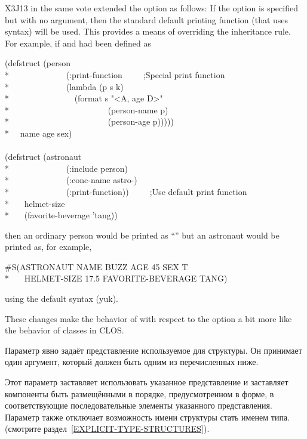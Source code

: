 \begin{flushdesc}
\begin{new}
  X3J13 in the same vote extended the  option as follows: If
  the  option is specified but with no argument, then the
  standard default printing function (that uses  syntax) will be used.
  This provides a means of overriding the inheritance rule.  For example, if
   and  had been defined as
\begin{lisp}
(defstruct (person \\*
~~~~~~~~~~~~~(:print-function~~~~~;\textrm{Special print function}\\*
~~~~~~~~~~~~~(lambda (p s k) \\*
~~~~~~~~~~~~~~~(format s "<{\Xtilde}A, age {\Xtilde}D>" \\*
~~~~~~~~~~~~~~~~~~~~~~~(person-name p) \\*
~~~~~~~~~~~~~~~~~~~~~~~(person-age p))))) \\*
~~name age sex) \\
\\
(defstruct (astronaut \\*
~~~~~~~~~~~~~(:include person) \\*
~~~~~~~~~~~~~(:conc-name astro-) \\*
~~~~~~~~~~~~~(:print-function))~~~~~;\textrm{Use default print function} \\*
~~~helmet-size \\*
~~~(favorite-beverage 'tang))
\end{lisp}
then an ordinary person would be printed as ``''
but an astronaut would be printed as, for example,
\begin{lisp}
\#S(ASTRONAUT NAME BUZZ AGE 45 SEX T \\*
~~~HELMET-SIZE 17.5 FAVORITE-BEVERAGE TANG)
\end{lisp}
using the default  syntax (yuk).

These changes make the behavior of  with respect to the
 option a bit more like the behavior of classes in CLOS.
\end{new}

\item[\cd{:type}] Параметр  явно задаёт представление используемое для
  структуры. Он принимает один аргумент, который должен быть одним из
  перечисленных ниже.

  Этот параметр заставляет использовать указанное представление и заставляет
  компоненты быть размещёнными в порядке, предусмотренном в 
  форме, в соответствующие последовательные элементы указанного представления.
  Параметр также отключает возможность имени структуры стать именем типа.
  (смотрите раздел~\ref{EXPLICIT-TYPE-STRUCTURES}).


\end{flushdesc}
